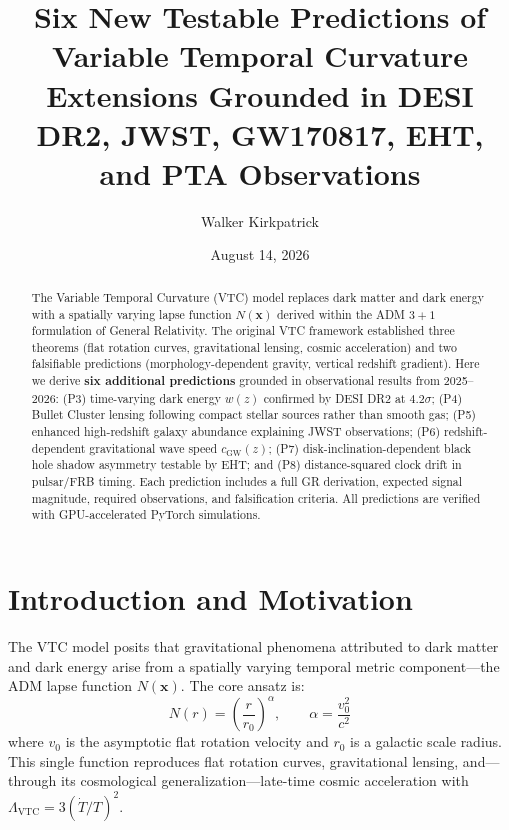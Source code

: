 \documentclass[11pt,a4paper]{article}
\title{\textbf{Six New Testable Predictions of Variable Temporal Curvature}\\[0.5em]
\large Extensions Grounded in DESI DR2, JWST, GW170817, EHT, and PTA Observations}
\author{Walker Kirkpatrick}
\date{August 14, 2026}
\theoremstyle{definition}
\newcommand{\VTC}{\mathrm{VTC}}
\begin{document}
\maketitle

\begin{abstract}
The Variable Temporal Curvature (VTC) model replaces dark matter and dark energy with a spatially varying lapse function $N(\mathbf{x})$ derived within the ADM $3+1$ formulation of General Relativity. The original VTC framework established three theorems (flat rotation curves, gravitational lensing, cosmic acceleration) and two falsifiable predictions (morphology-dependent gravity, vertical redshift gradient). Here we derive \textbf{six additional predictions} grounded in observational results from 2025--2026: (P3) time-varying dark energy $w(z)$ confirmed by DESI DR2 at $4.2\sigma$; (P4) Bullet Cluster lensing following compact stellar sources rather than smooth gas; (P5) enhanced high-redshift galaxy abundance explaining JWST observations; (P6) redshift-dependent gravitational wave speed $c_\mathrm{GW}(z)$; (P7) disk-inclination-dependent black hole shadow asymmetry testable by EHT; and (P8) distance-squared clock drift in pulsar/FRB timing. Each prediction includes a full GR derivation, expected signal magnitude, required observations, and falsification criteria. All predictions are verified with GPU-accelerated PyTorch simulations.
\end{abstract}

\tableofcontents
\newpage

\section{Introduction and Motivation}

The VTC model \cite{VTC2026} posits that gravitational phenomena attributed to dark matter and dark energy arise from a spatially varying temporal metric component---the ADM lapse function $N(\mathbf{x})$. The core ansatz is:
\begin{equation}
N(r) = \left(\frac{r}{r_0}\right)^{\alpha}, \qquad \alpha = \frac{v_0^2}{c^2}
\end{equation}
where $v_0$ is the asymptotic flat rotation velocity and $r_0$ is a galactic scale radius. This single function reproduces flat rotation curves, gravitational lensing, and---through its cosmological generalization---late-time cosmic acceleration with $\Lambda_\VTC = 3(\dot{T}/T)^2$.
\end{document}

